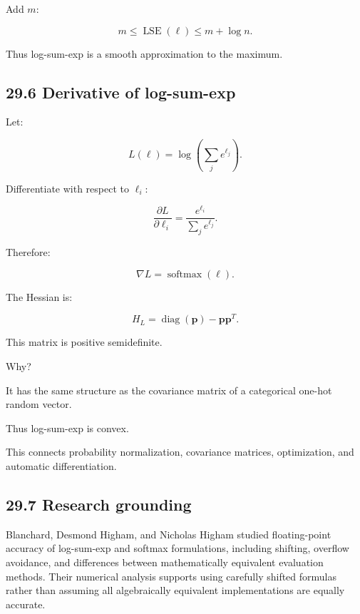 Add \(m\):

\[ \boxed{ m\le\operatorname{LSE}(\ell)\le m+\log n }. \]

Thus log-sum-exp is a smooth approximation to the maximum.

\subsection{29.6 Derivative of log-sum-exp}\label{02-foundations-ii-ch031-derivative-of-log-sum-exp}

\hypertarget{02-foundations-ii-ch031-derivative-of-log-sum-exp}{}

Let:

\[ L(\ell)=\log\left(\sum_je^{\ell_j}\right). \]

Differentiate with respect to \(\ell_i\):

\[ \frac{\partial L}{\partial\ell_i} = \frac{e^{\ell_i}}{\sum_je^{\ell_j}}. \]

Therefore:

\[ \boxed{ \nabla L=\operatorname{softmax}(\ell) }. \]

The Hessian is:

\[ \boxed{ H_L= \operatorname{diag}(\mathbf p)-\mathbf p\mathbf p^T }. \]

This matrix is positive semidefinite.

Why?

It has the same structure as the covariance matrix of a categorical one-hot random vector.

Thus log-sum-exp is convex.

This connects probability normalization, covariance matrices, optimization, and automatic differentiation.

\subsection{29.7 Research grounding}\label{02-foundations-ii-ch031-research-grounding}

\hypertarget{02-foundations-ii-ch031-research-grounding}{}

Blanchard, Desmond Higham, and Nicholas Higham studied floating-point accuracy of log-sum-exp and softmax formulations, including shifting, overflow avoidance, and differences between mathematically equivalent evaluation methods. Their numerical analysis supports using carefully shifted formulas rather than assuming all algebraically equivalent implementations are equally accurate. 

